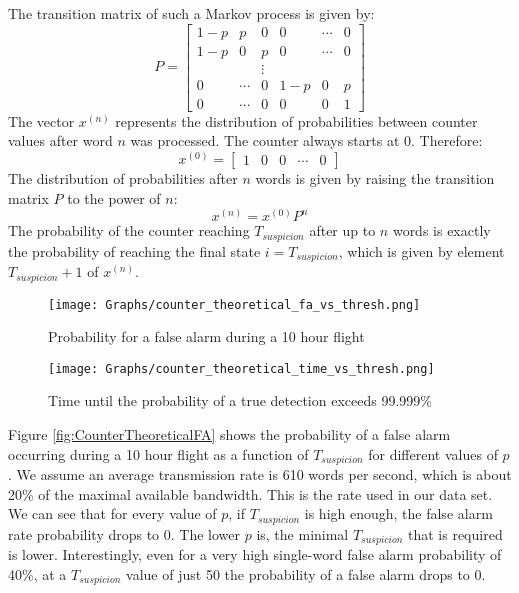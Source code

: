 \documentclass[compsoc,conference,a4paper,10pt,times]{IEEEtran}
\begin{document}
  The transition matrix of such a Markov process is given by:
  \begin{equation}
    P = \begin{bmatrix}
      1 - p & p     & 0      & 0 & \cdots & 0 \\
      1 - p & 0     & p      & 0 & \cdots & 0 \\
            &       & \vdots &   &       &   \\
      0     & \cdots & 0 & 1 - p  & 0 & p     \\
      0     & \cdots & 0 & 0      & 0 & 1
    \end{bmatrix}
  \end{equation}
  The vector \(x^{(n)}\) represents the distribution of probabilities between counter values after word $n$ was processed. The counter always starts at 0. Therefore:
  \begin{equation}
    x^{(0)} = \begin{bmatrix}
    1 & 0 & 0 & \cdots & 0
    \end{bmatrix}
  \end{equation}
  The distribution of probabilities after $n$ words is given by raising the transition matrix $P$ to the power of $n$:
  \begin{equation} \label{eq:prob_after_n_words}
    x^{(n)} = x^{(0)}P^n
  \end{equation}
   The probability of the counter reaching $T_{suspicion}$ after up to $n$ words is exactly the probability of reaching the final state $i = T_{suspicion}$, which is given by element $T_{suspicion} + 1$ of $x^{(n)}$.
   
  \begin{figure}[t]
    \centering
    \texttt{[image: Graphs/counter\_theoretical\_fa\_vs\_thresh.png]}
    \caption{Probability for a false alarm during a 10 hour flight}
    \label{fig:CounterTheoreticalFA}
    
    \texttt{[image: Graphs/counter\_theoretical\_time\_vs\_thresh.png]}
    \caption{Time until the probability of a true detection exceeds 99.999\%}
    \label{fig:CounterTheoreticalTime}
  \end{figure}

  Figure \ref{fig:CounterTheoreticalFA} shows the probability of a false alarm occurring during a 10 hour flight as a function of $T_{suspicion}$ for different values of $p$. We assume an average transmission rate is 610 words per second, which is about 20\% of the maximal available bandwidth. This is the rate used in our data set. We can see that for every value of $p$, if $T_{suspicion}$ is high enough, the false alarm rate probability drops to 0. The lower $p$ is, the minimal $T_{suspicion}$ that is required is lower. Interestingly, even for a very high single-word false alarm probability of 40\%, at a $T_{suspicion}$ value of just 50 the probability of a false alarm drops to 0.
   
\end{document}
